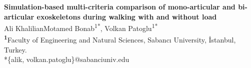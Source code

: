 \documentclass[10pt,letterpaper]{article}
\begin{document}
\vspace*{0.2in}

\begin{flushleft}
{\Large
\textbf{{Simulation-based multi-criteria comparison of mono-articular and bi-articular exoskeletons during walking with and without load}} %
}
\newline
\\
Ali KhalilianMotamed Bonab\textsuperscript{1*},
Volkan Patoglu\textsuperscript{1*}
\\
\bigskip
\textsuperscript{\textbf{1}}Faculty of Engineering and Natural Sciences, Sabanc{\i} University, \.{I}stanbul, Turkey.
\\
*\{alik, volkan.patoglu\}@sabanciuniv.edu

\end{flushleft}



\end{document}
